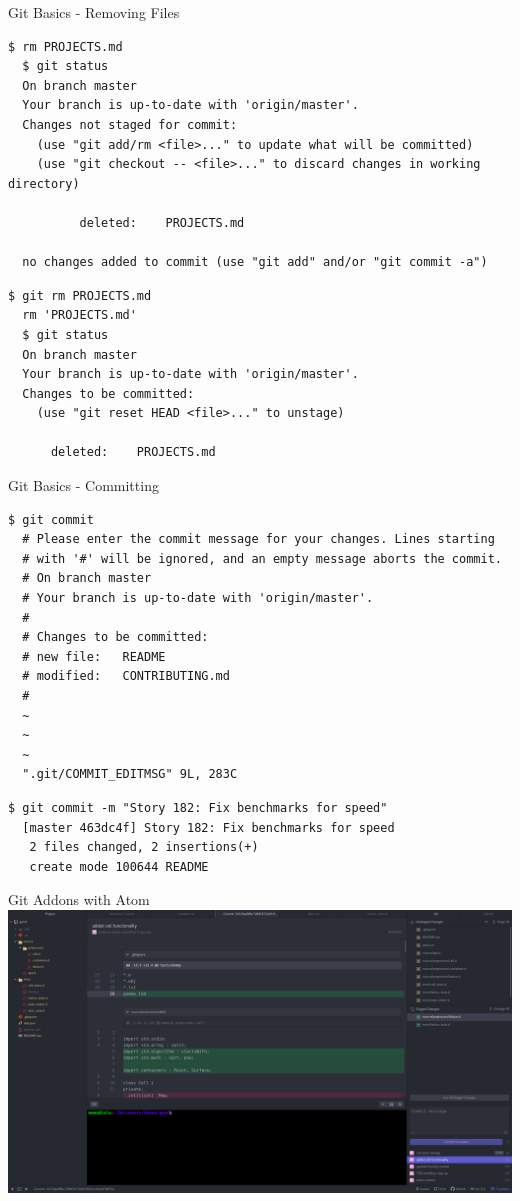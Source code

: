 \documentclass[sans,mathserif,aspectratio=169]{beamer}
\begin{document}
\begin{frame}[fragile]{Git Basics - Removing Files}
  \begin{lstlisting}[frame=single, backgroundcolor=\color{gray!20}, basicstyle=\tiny]
  $ rm PROJECTS.md
  $ git status
  On branch master
  Your branch is up-to-date with 'origin/master'.
  Changes not staged for commit:
    (use "git add/rm <file>..." to update what will be committed)
    (use "git checkout -- <file>..." to discard changes in working directory)

          deleted:    PROJECTS.md

  no changes added to commit (use "git add" and/or "git commit -a")
  \end{lstlisting}
  \pause
  \begin{lstlisting}[frame=single, backgroundcolor=\color{gray!20}, basicstyle=\tiny]
  $ git rm PROJECTS.md
  rm 'PROJECTS.md'
  $ git status
  On branch master
  Your branch is up-to-date with 'origin/master'.
  Changes to be committed:
    (use "git reset HEAD <file>..." to unstage)

      deleted:    PROJECTS.md
  \end{lstlisting}
\end{frame}

\begin{frame}[fragile]{Git Basics - Committing}
  \begin{lstlisting}[frame=single, backgroundcolor=\color{gray!20}, basicstyle=\tiny]
  $ git commit
  # Please enter the commit message for your changes. Lines starting
  # with '#' will be ignored, and an empty message aborts the commit.
  # On branch master
  # Your branch is up-to-date with 'origin/master'.
  #
  # Changes to be committed:
  #	new file:   README
  #	modified:   CONTRIBUTING.md
  #
  ~
  ~
  ~
  ".git/COMMIT_EDITMSG" 9L, 283C
  \end{lstlisting}
  \pause
  \begin{lstlisting}[frame=single, backgroundcolor=\color{gray!20}, basicstyle=\tiny]
  $ git commit -m "Story 182: Fix benchmarks for speed"
  [master 463dc4f] Story 182: Fix benchmarks for speed
   2 files changed, 2 insertions(+)
   create mode 100644 README
  \end{lstlisting}
\end{frame}

\begin{frame}{Git Addons with Atom}
  \centering
  \includegraphics[width=0.85\linewidth]{git_atom.png}
\end{frame}
\end{document}
